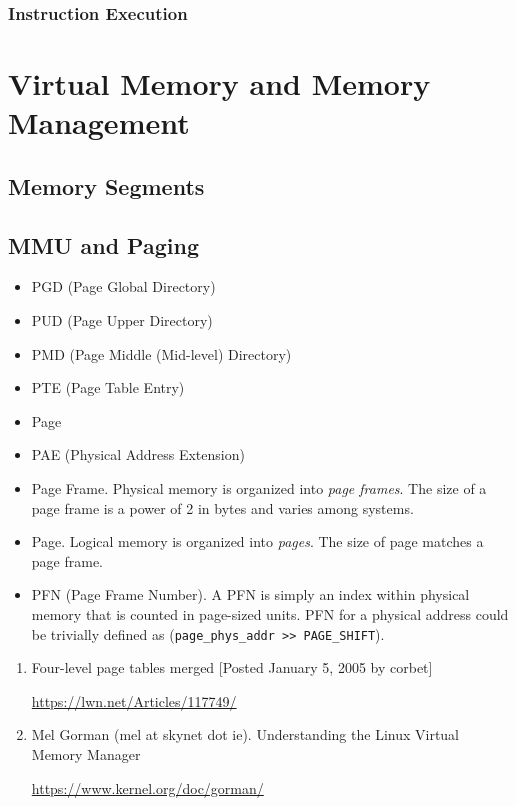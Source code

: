 \documentclass[12pt,a4paper]{article}
\begin{document}
\subsubsection{Instruction Execution}

\section{Virtual Memory and Memory Management}

\subsection{Memory Segments}

\subsection{MMU and Paging}

\begin{itemize}
\item PGD (Page Global Directory)
\item PUD (Page Upper Directory)
\item PMD (Page Middle (Mid-level) Directory)
\item PTE (Page Table Entry)
\item Page
\end{itemize}

\begin{itemize}
\item PAE (Physical Address Extension)
\item Page Frame.  Physical memory is organized into \emph{page frames}.  The 
size of a page frame is a power of 2 in bytes and varies among systems.
\item Page.  Logical memory is organized into \emph{pages}. The size of page 
matches a page frame.
\item PFN (Page Frame Number).  A PFN is simply an index within physical memory 
that is counted in page-sized units. PFN for a physical address could be 
trivially defined as (\verb"page_phys_addr >> PAGE_SHIFT").
\end{itemize}

\begin{enumerate}
\item Four-level page tables merged [Posted January 5, 2005 by corbet]

    \url{https://lwn.net/Articles/117749/}

\item Mel Gorman (mel at skynet dot ie).  Understanding the Linux Virtual Memory Manager

    \url{https://www.kernel.org/doc/gorman/}
\end{enumerate}
\end{document}
